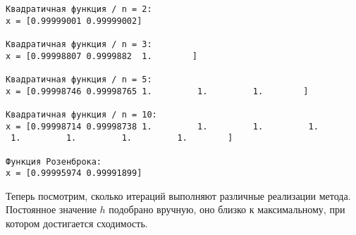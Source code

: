 \documentclass[11pt]{article}
\begin{document}
    \begin{Verbatim}[commandchars=\\\{\}]
Квадратичная функция / n = 2:
x = [0.99999001 0.99999002]

Квадратичная функция / n = 3:
x = [0.99998807 0.9999882  1.        ]

Квадратичная функция / n = 5:
x = [0.99998746 0.99998765 1.         1.         1.        ]

Квадратичная функция / n = 10:
x = [0.99998714 0.99998738 1.         1.         1.         1.
 1.         1.         1.         1.        ]

Функция Розенброка:
x = [0.99995974 0.99991899]

    \end{Verbatim}

\newpage
    Теперь посмотрим, сколько итераций выполняют различные реализации
метода. Постоянное значение \(h\) подобрано вручную, оно близко к
максимальному, при котором достигается сходимость.
\end{document}
